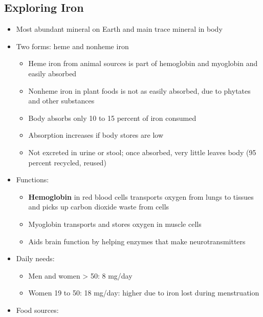 \documentclass[12pt]{article}
\begin{document}
        \subsection{Exploring Iron}
            \begin{itemize}
                \item Most abundant mineral on Earth and main trace mineral in body
                \item Two forms: heme and nonheme iron
                    \begin{itemize}
                        \item Heme iron from animal sources is part of hemoglobin and myoglobin and easily absorbed
                        \item Nonheme iron in plant foods is not as easily absorbed, due to phytates and other substances
                        \item Body absorbs only 10 to 15 percent of iron consumed
                        \item Absorption increases if body stores are low
                        \item Not excreted in urine or stool; once absorbed, very little leaves body (95 percent recycled, reused)
                    \end{itemize}
                \item Functions:
                    \begin{itemize}
                        \item \textbf{Hemoglobin} in red blood cells transports oxygen from lungs to tissues and picks up carbon dioxide waste from cells
                        \item Myoglobin transports and stores oxygen in muscle cells
                        \item Aids brain function by helping enzymes that make neurotransmitters
                    \end{itemize}
                \item Daily needs:
                    \begin{itemize}
                        \item Men and women > 50: 8 mg/day
                        \item Women 19 to 50: 18 mg/day: higher due to iron lost during menstruation
                    \end{itemize}
                \item Food sources:
                    \begin{itemize}

\end{itemize}
\end{itemize}
\end{document}
